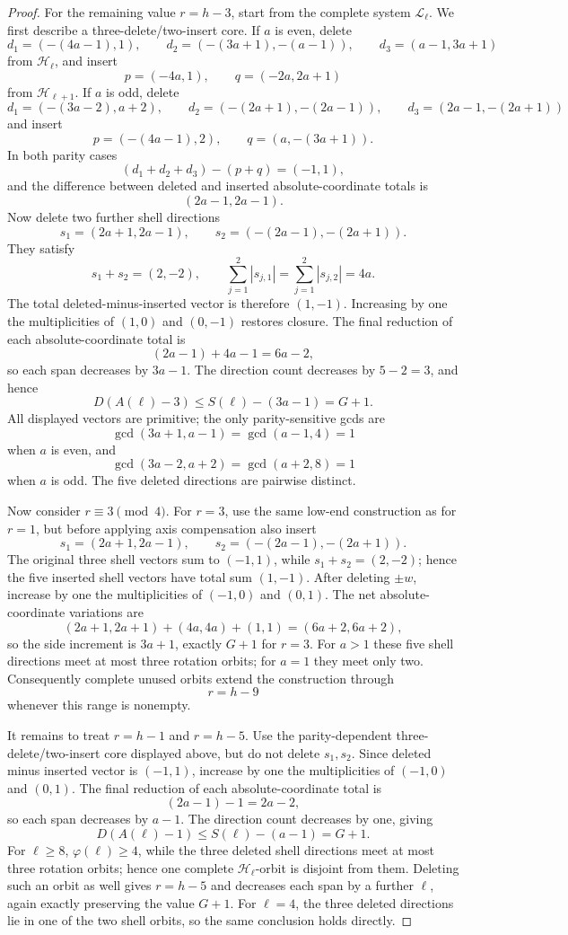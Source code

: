 \documentclass[11pt]{article}
\theoremstyle{definition}
\newcommand{\HH}{\mathcal H}
\newcommand{\LL}{\mathcal L}
\begin{document}
\begin{proof}
For the remaining value \(r=h-3\), start from the complete system \(\LL_\ell\).  We first describe a three-delete/two-insert core.  If \(a\) is even, delete
\[
d_1=(-(4a-1),1),\qquad
d_2=(-(3a+1),-(a-1)),\qquad
d_3=(a-1,3a+1)
\]
from \(\HH_\ell\), and insert
\[
p=(-4a,1),\qquad q=(-2a,2a+1)
\]
from \(\HH_{\ell+1}\).  If \(a\) is odd, delete
\[
d_1=(-(3a-2),a+2),\qquad
d_2=(-(2a+1),-(2a-1)),\qquad
d_3=(2a-1,-(2a+1))
\]
and insert
\[
p=(-(4a-1),2),\qquad q=(a,-(3a+1)).
\]
In both parity cases
\[
(d_1+d_2+d_3)-(p+q)=(-1,1),
\]
and the difference between deleted and inserted absolute-coordinate totals is
\[
(2a-1,2a-1).
\]
Now delete two further shell directions
\[
s_1=(2a+1,2a-1),\qquad
s_2=(-(2a-1),-(2a+1)).
\]
They satisfy
\[
s_1+s_2=(2,-2),
\qquad
\sum_{j=1}^2|s_{j,1}|=
\sum_{j=1}^2|s_{j,2}|=4a.
\]
The total deleted-minus-inserted vector is therefore \((1,-1)\).  Increasing by one the multiplicities of \((1,0)\) and \((0,-1)\) restores closure.  The final reduction of each absolute-coordinate total is
\[
(2a-1)+4a-1=6a-2,
\]
so each span decreases by \(3a-1\).  The direction count decreases by \(5-2=3\), and hence
\[
D(A(\ell)-3)\le S(\ell)-(3a-1)=G+1.
\]
All displayed vectors are primitive; the only parity-sensitive gcds are
\[
\gcd(3a+1,a-1)=\gcd(a-1,4)=1
\]
when \(a\) is even, and
\[
\gcd(3a-2,a+2)=\gcd(a+2,8)=1
\]
when \(a\) is odd.  The five deleted directions are pairwise distinct.

Now consider \(r\equiv3\pmod4\).  For \(r=3\), use the same low-end construction as for \(r=1\), but before applying axis compensation also insert
\[
s_1=(2a+1,2a-1),\qquad
s_2=(-(2a-1),-(2a+1)).
\]
The original three shell vectors sum to \((-1,1)\), while \(s_1+s_2=(2,-2)\); hence the five inserted shell vectors have total sum \((1,-1)\).  After deleting \(\pm w\), increase by one the multiplicities of \((-1,0)\) and \((0,1)\).  The net absolute-coordinate variations are
\[
(2a+1,2a+1)+(4a,4a)+(1,1)
=(6a+2,6a+2),
\]
so the side increment is \(3a+1\), exactly \(G+1\) for \(r=3\).  For \(a>1\) these five shell directions meet at most three rotation orbits; for \(a=1\) they meet only two.  Consequently complete unused orbits extend the construction through
\[
r=h-9
\]
whenever this range is nonempty.

It remains to treat \(r=h-1\) and \(r=h-5\).  Use the parity-dependent three-delete/two-insert core displayed above, but do not delete \(s_1,s_2\).  Since deleted minus inserted vector is \((-1,1)\), increase by one the multiplicities of \((-1,0)\) and \((0,1)\).  The final reduction of each absolute-coordinate total is
\[
(2a-1)-1=2a-2,
\]
so each span decreases by \(a-1\).  The direction count decreases by one, giving
\[
D(A(\ell)-1)\le S(\ell)-(a-1)=G+1.
\]
For \(\ell\ge8\), \(\varphi(\ell)\ge4\), while the three deleted shell directions meet at most three rotation orbits; hence one complete \(\HH_\ell\)-orbit is disjoint from them.  Deleting such an orbit as well gives \(r=h-5\) and decreases each span by a further \(\ell\), again exactly preserving the value \(G+1\).  For \(\ell=4\), the three deleted directions lie in one of the two shell orbits, so the same conclusion holds directly.


\end{proof}
\end{document}
